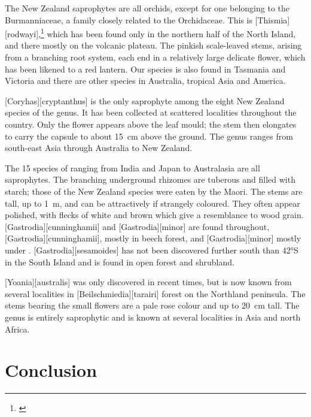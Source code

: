 The New Zealand saprophytes are all orchids, except for one belonging to the Burmanniaceae, a family closely related to the Orchidaceae.
This is [Thismia][rodwayi],\footnote{\cite{campbell1968investigation}} which has been found only in the northern half of the North Island, and there mostly on the volcanic plateau.
The pinkish scale-leaved stems, arising from a branching root system, each end in a relatively large delicate flower, which has been likened to a red lantern.
Our species is also found in Tasmania and Victoria and there are other species in Australia, tropical Asia and America.

[Coryhas][cryptanthus] is the only saprophyte among the eight New Zealand species of the genus.
It has been collected at scattered localities throughout the country.
Only the flower appears above the leaf mould; the stem then elongates to carry the capsule to about \SI{15}{\centi\metre} above the ground.
The genus ranges from south-east Asia through Australia to New Zealand.

The 15 species of  ranging from India and Japan to Australasia are all saprophytes.
The branching underground rhizomes are tuberous and filled with starch; those of the New Zealand species were eaten by the Maori.
The stems are tall, up to \SI{1}{\metre}, and can be attractively if strangely coloured.
They often appear polished, with flecks of white and brown which give a resemblance to wood grain. [Gastrodia][cunninghamii] and [Gastrodia][minor] are found throughout, [Gastrodia][cunninghamii], mostly in beech forest, and [Gastrodia][minor] mostly under . [Gastrodia][sesamoides] has not been discovered further south than \ang{42}S in the South Island and is found in open forest and shrubland.

[Yoania][australis] was only discovered in recent times, but is now known from several localities in [Beilschmiedia][tarairi] forest on the Northland peninsula.
The stems bearing the small flowers are a pale rose colour and up to \SI{20}{\centi\metre} tall.
The genus is entirely saprophytic and is known at several localities in Asia and north Africa.

\section{Conclusion}

